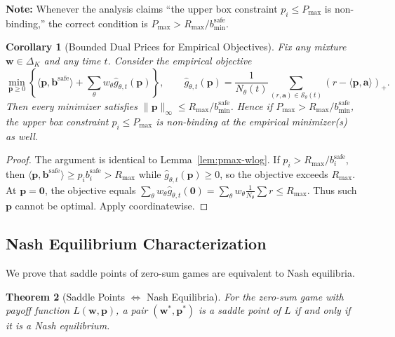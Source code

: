\documentclass[11pt]{article}
\newtheorem{theorem}{Theorem}
\newtheorem{corollary}[theorem]{Corollary}
\newcommand{\bbS}{\mathbf{b}^{\mathrm{safe}}}
\newcommand{\ba}{\mathbf{a}}
\newcommand{\bp}{\mathbf{p}}
\newcommand{\bw}{\mathbf{w}}
\newcommand{\cS}{\mathcal{S}}
\begin{document}
\textbf{Note:} Whenever the analysis claims ``the upper box constraint $p_i \le P_{\max}$ is non-binding,'' the correct condition is $P_{\max} > R_{\max}/b^{\mathrm{safe}}_{\min}$.

\begin{corollary}[Bounded Dual Prices for Empirical Objectives]
\label{cor:pmax-wlog-emp}
Fix any mixture $\bw\in\Delta_K$ and any time $t$. Consider the empirical objective
\[
\min_{\bp\ge 0}\left\{\langle \bp,\bbS\rangle + \sum_{\theta} w_\theta \widehat g_{\theta,t}(\bp)\right\},
\qquad
\widehat g_{\theta,t}(\bp)=\frac{1}{N_\theta(t)}\sum_{(r,\ba)\in\cS_\theta(t)}(r-\langle \bp,\ba\rangle)_+.
\]
Then every minimizer satisfies $\|\bp\|_\infty \le R_{\max}/b^{\mathrm{safe}}_{\min}$.
Hence if $P_{\max}> R_{\max}/b^{\mathrm{safe}}_{\min}$, the upper box constraint $p_i\le P_{\max}$
is non-binding at the empirical minimizer(s) as well.
\end{corollary}

\begin{proof}
The argument is identical to Lemma~\ref{lem:pmax-wlog}. If $p_i>R_{\max}/b^{\mathrm{safe}}_i$, then
$\langle \bp,\bbS\rangle \ge p_i b^{\mathrm{safe}}_i>R_{\max}$ while $\widehat g_{\theta,t}(\bp)\ge 0$,
so the objective exceeds $R_{\max}$. At $\bp=\mathbf{0}$, the objective equals
$\sum_\theta w_\theta \widehat g_{\theta,t}(\mathbf{0})=\sum_\theta w_\theta \frac1{N_\theta}\sum r \le R_{\max}$.
Thus such $\bp$ cannot be optimal. Apply coordinatewise.
\end{proof}

\subsection{Nash Equilibrium Characterization}
\label{app:nash-proof}

We prove that saddle points of zero-sum games are equivalent to Nash equilibria.

\begin{theorem}[Saddle Points $\Leftrightarrow$ Nash Equilibria]
\label{thm:nash-equilibrium}
For the zero-sum game with payoff function $L(\bw, \bp)$, a pair $(\bw^*, \bp^*)$ is a saddle point of $L$ if and only if it is a Nash equilibrium.
\end{theorem}
\end{document}
